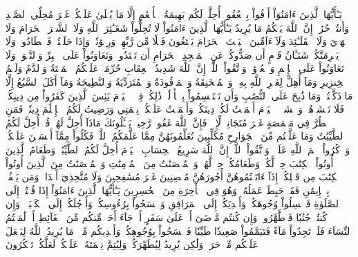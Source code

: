 يَـٰٓأَيُّهَا ٱلَّذِينَ ءَامَنُوٓاْ أَوۡفُواْ بِٱلۡعُقُودِۚ أُحِلَّتۡ لَكُم بَهِيمَةُ ٱلۡأَنۡعَٰمِ إِلَّا مَا يُتۡلَىٰ عَلَيۡكُمۡ غَيۡرَ مُحِلِّي ٱلصَّيۡدِ وَأَنتُمۡ حُرُمٌۗ إِنَّ ٱللَّهَ يَحۡكُمُ مَا يُرِيدُ
يَـٰٓأَيُّهَا ٱلَّذِينَ ءَامَنُواْ لَا تُحِلُّواْ شَعَـٰٓئِرَ ٱللَّهِ وَلَا ٱلشَّهۡرَ ٱلۡحَرَامَ وَلَا ٱلۡهَدۡيَ وَلَا ٱلۡقَلَـٰٓئِدَ وَلَآ ءَآمِّينَ ٱلۡبَيۡتَ ٱلۡحَرَامَ يَبۡتَغُونَ فَضۡلٗا مِّن رَّبِّهِمۡ وَرِضۡوَٰنٗاۚ وَإِذَا حَلَلۡتُمۡ فَٱصۡطَادُواْۚ وَلَا يَجۡرِمَنَّكُمۡ شَنَـَٔانُ قَوۡمٍ أَن صَدُّوكُمۡ عَنِ ٱلۡمَسۡجِدِ ٱلۡحَرَامِ أَن تَعۡتَدُواْۘ وَتَعَاوَنُواْ عَلَى ٱلۡبِرِّ وَٱلتَّقۡوَىٰۖ وَلَا تَعَاوَنُواْ عَلَى ٱلۡإِثۡمِ وَٱلۡعُدۡوَٰنِۚ وَٱتَّقُواْ ٱللَّهَۖ إِنَّ ٱللَّهَ شَدِيدُ ٱلۡعِقَابِ
حُرِّمَتۡ عَلَيۡكُمُ ٱلۡمَيۡتَةُ وَٱلدَّمُ وَلَحۡمُ ٱلۡخِنزِيرِ وَمَآ أُهِلَّ لِغَيۡرِ ٱللَّهِ بِهِۦ وَٱلۡمُنۡخَنِقَةُ وَٱلۡمَوۡقُوذَةُ وَٱلۡمُتَرَدِّيَةُ وَٱلنَّطِيحَةُ وَمَآ أَكَلَ ٱلسَّبُعُ إِلَّا مَا ذَكَّيۡتُمۡ وَمَا ذُبِحَ عَلَى ٱلنُّصُبِ وَأَن تَسۡتَقۡسِمُواْ بِٱلۡأَزۡلَٰمِۚ ذَٰلِكُمۡ فِسۡقٌۗ ٱلۡيَوۡمَ يَئِسَ ٱلَّذِينَ كَفَرُواْ مِن دِينِكُمۡ فَلَا تَخۡشَوۡهُمۡ وَٱخۡشَوۡنِۚ ٱلۡيَوۡمَ أَكۡمَلۡتُ لَكُمۡ دِينَكُمۡ وَأَتۡمَمۡتُ عَلَيۡكُمۡ نِعۡمَتِي وَرَضِيتُ لَكُمُ ٱلۡإِسۡلَٰمَ دِينٗاۚ فَمَنِ ٱضۡطُرَّ فِي مَخۡمَصَةٍ غَيۡرَ مُتَجَانِفٖ لِّإِثۡمٖ فَإِنَّ ٱللَّهَ غَفُورٞ رَّحِيمٞ
يَسۡـَٔلُونَكَ مَاذَآ أُحِلَّ لَهُمۡۖ قُلۡ أُحِلَّ لَكُمُ ٱلطَّيِّبَٰتُ وَمَا عَلَّمۡتُم مِّنَ ٱلۡجَوَارِحِ مُكَلِّبِينَ تُعَلِّمُونَهُنَّ مِمَّا عَلَّمَكُمُ ٱللَّهُۖ فَكُلُواْ مِمَّآ أَمۡسَكۡنَ عَلَيۡكُمۡ وَٱذۡكُرُواْ ٱسۡمَ ٱللَّهِ عَلَيۡهِۖ وَٱتَّقُواْ ٱللَّهَۚ إِنَّ ٱللَّهَ سَرِيعُ ٱلۡحِسَابِ
ٱلۡيَوۡمَ أُحِلَّ لَكُمُ ٱلطَّيِّبَٰتُۖ وَطَعَامُ ٱلَّذِينَ أُوتُواْ ٱلۡكِتَٰبَ حِلّٞ لَّكُمۡ وَطَعَامُكُمۡ حِلّٞ لَّهُمۡۖ وَٱلۡمُحۡصَنَٰتُ مِنَ ٱلۡمُؤۡمِنَٰتِ وَٱلۡمُحۡصَنَٰتُ مِنَ ٱلَّذِينَ أُوتُواْ ٱلۡكِتَٰبَ مِن قَبۡلِكُمۡ إِذَآ ءَاتَيۡتُمُوهُنَّ أُجُورَهُنَّ مُحۡصِنِينَ غَيۡرَ مُسَٰفِحِينَ وَلَا مُتَّخِذِيٓ أَخۡدَانٖۗ وَمَن يَكۡفُرۡ بِٱلۡإِيمَٰنِ فَقَدۡ حَبِطَ عَمَلُهُۥ وَهُوَ فِي ٱلۡأٓخِرَةِ مِنَ ٱلۡخَٰسِرِينَ
يَـٰٓأَيُّهَا ٱلَّذِينَ ءَامَنُوٓاْ إِذَا قُمۡتُمۡ إِلَى ٱلصَّلَوٰةِ فَٱغۡسِلُواْ وُجُوهَكُمۡ وَأَيۡدِيَكُمۡ إِلَى ٱلۡمَرَافِقِ وَٱمۡسَحُواْ بِرُءُوسِكُمۡ وَأَرۡجُلَكُمۡ إِلَى ٱلۡكَعۡبَيۡنِۚ وَإِن كُنتُمۡ جُنُبٗا فَٱطَّهَّرُواْۚ وَإِن كُنتُم مَّرۡضَىٰٓ أَوۡ عَلَىٰ سَفَرٍ أَوۡ جَآءَ أَحَدٞ مِّنكُم مِّنَ ٱلۡغَآئِطِ أَوۡ لَٰمَسۡتُمُ ٱلنِّسَآءَ فَلَمۡ تَجِدُواْ مَآءٗ فَتَيَمَّمُواْ صَعِيدٗا طَيِّبٗا فَٱمۡسَحُواْ بِوُجُوهِكُمۡ وَأَيۡدِيكُم مِّنۡهُۚ مَا يُرِيدُ ٱللَّهُ لِيَجۡعَلَ عَلَيۡكُم مِّنۡ حَرَجٖ وَلَٰكِن يُرِيدُ لِيُطَهِّرَكُمۡ وَلِيُتِمَّ نِعۡمَتَهُۥ عَلَيۡكُمۡ لَعَلَّكُمۡ تَشۡكُرُونَ
